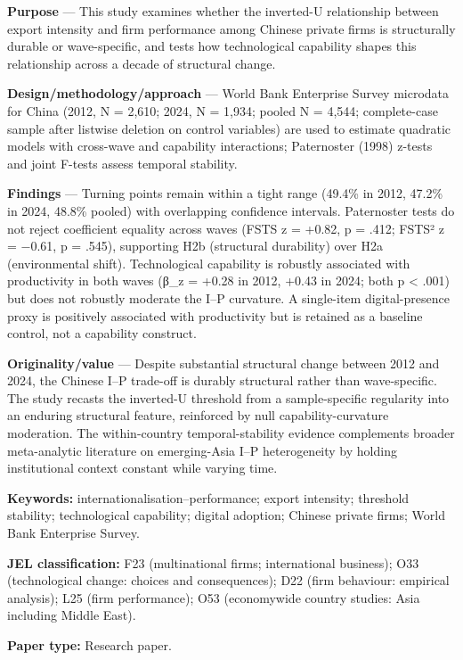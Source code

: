 \documentclass[12pt,a4paper]{article}
\begin{document}
\textbf{Purpose} --- This study examines whether the inverted-U
relationship between export intensity and firm performance among Chinese
private firms is structurally durable or wave-specific, and tests how
technological capability shapes this relationship across a decade of
structural change.

\textbf{Design/methodology/approach} --- World Bank Enterprise Survey
microdata for China (2012, N = 2,610; 2024, N = 1,934; pooled N = 4,544;
complete-case sample after listwise deletion on control variables) are
used to estimate quadratic models with cross-wave and capability
interactions; Paternoster (1998) z-tests and joint F-tests assess
temporal stability.

\textbf{Findings} --- Turning points remain within a tight range (49.4\%
in 2012, 47.2\% in 2024, 48.8\% pooled) with overlapping confidence
intervals. Paternoster tests do not reject coefficient equality across
waves (FSTS z = +0.82, p = .412; FSTS² z = −0.61, p = .545), supporting
H2b (structural durability) over H2a (environmental shift).
Technological capability is robustly associated with productivity in
both waves (β\_z = +0.28 in 2012, +0.43 in 2024; both p \textless{}
.001) but does not robustly moderate the I--P curvature. A single-item
digital-presence proxy is positively associated with productivity but is
retained as a baseline control, not a capability construct.

\textbf{Originality/value} --- Despite substantial structural change
between 2012 and 2024, the Chinese I--P trade-off is durably structural
rather than wave-specific. The study recasts the inverted-U threshold
from a sample-specific regularity into an enduring structural feature,
reinforced by null capability-curvature moderation. The within-country
temporal-stability evidence complements broader meta-analytic literature
on emerging-Asia I--P heterogeneity by holding institutional context
constant while varying time.

\textbf{Keywords:} internationalisation--performance; export intensity;
threshold stability; technological capability; digital adoption; Chinese
private firms; World Bank Enterprise Survey.

\textbf{JEL classification:} F23 (multinational firms; international
business); O33 (technological change: choices and consequences); D22
(firm behaviour: empirical analysis); L25 (firm performance); O53
(economywide country studies: Asia including Middle East).

\textbf{Paper type:} Research paper.
\end{document}
